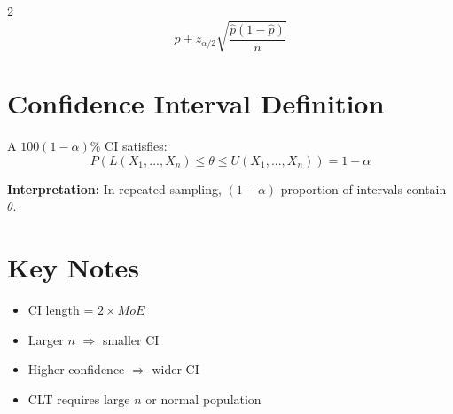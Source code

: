 \documentclass[10pt]{article}
\begin{document}
\begin{multicols}{2}
\[
\hat{p} \pm z_{\alpha/2} \sqrt{\frac{\hat{p}(1-\hat{p})}{n}}
\]

\section*{Confidence Interval Definition}

A $100(1-\alpha)\%$ CI satisfies:
\[
P(L(X_1,...,X_n) \le \theta \le U(X_1,...,X_n)) = 1-\alpha
\]

\textbf{Interpretation:}
\newline
In repeated sampling, $(1-\alpha)$ proportion of intervals contain $\theta$.

\section*{Key Notes}

\begin{itemize}
\item CI length = $2 \times MoE$
\item Larger $n$ $\Rightarrow$ smaller CI
\item Higher confidence $\Rightarrow$ wider CI
\item CLT requires large $n$ or normal population
\end{itemize}

\end{multicols}
\end{document}

